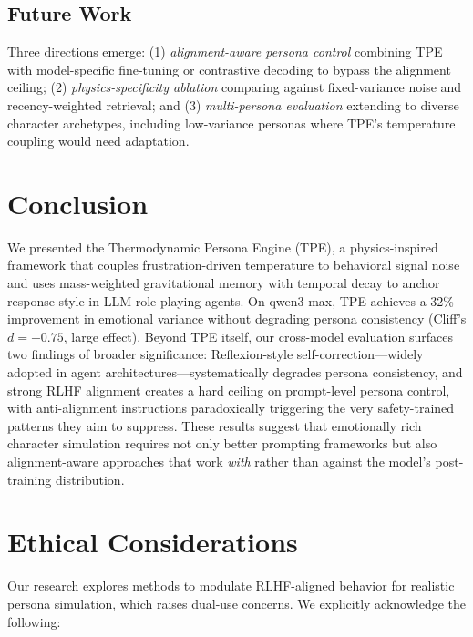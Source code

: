 \subsection{Future Work}

Three directions emerge: (1) \emph{alignment-aware persona control} combining TPE with model-specific fine-tuning or contrastive decoding to bypass the alignment ceiling; (2) \emph{physics-specificity ablation} comparing against fixed-variance noise and recency-weighted retrieval; and (3) \emph{multi-persona evaluation} extending to diverse character archetypes, including low-variance personas where TPE's temperature coupling would need adaptation.

\section{Conclusion}

We presented the Thermodynamic Persona Engine (TPE), a physics-inspired framework that couples frustration-driven temperature to behavioral signal noise and uses mass-weighted gravitational memory with temporal decay to anchor response style in LLM role-playing agents. On qwen3-max, TPE achieves a 32\% improvement in emotional variance without degrading persona consistency (Cliff's $d = +0.75$, large effect). Beyond TPE itself, our cross-model evaluation surfaces two findings of broader significance: Reflexion-style self-correction---widely adopted in agent architectures---systematically degrades persona consistency, and strong RLHF alignment creates a hard ceiling on prompt-level persona control, with anti-alignment instructions paradoxically triggering the very safety-trained patterns they aim to suppress. These results suggest that emotionally rich character simulation requires not only better prompting frameworks but also alignment-aware approaches that work \emph{with} rather than against the model's post-training distribution.

\section{Ethical Considerations}

Our research explores methods to modulate RLHF-aligned behavior for realistic persona simulation, which raises dual-use concerns. We explicitly acknowledge the following:


